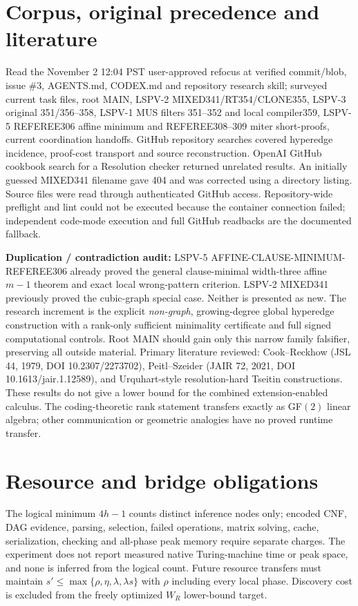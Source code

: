 \documentclass[11pt]{article}
\begin{document}
\section*{Corpus, original precedence and literature}
Read the November 2 12:04 PST user-approved refocus at verified commit/blob, issue \#3, AGENTS.md, CODEX.md and repository research skill; surveyed current task files, root MAIN, LSPV-2 MIXED341/RT354/CLONE355, LSPV-3 original 351/356--358, LSPV-1 MUS filters 351--352 and local compiler359, LSPV-5 REFEREE306 affine minimum and REFEREE308--309 miter short-proofs, current coordination handoffs. GitHub repository searches covered hyperedge incidence, proof-cost transport and source reconstruction. OpenAI GitHub cookbook search for a Resolution checker returned unrelated results. An initially guessed MIXED341 filename gave 404 and was corrected using a directory listing. Source files were read through authenticated GitHub access. Repository-wide preflight and lint could not be executed because the container connection failed; independent code-mode execution and full GitHub readbacks are the documented fallback.

\textbf{Duplication / contradiction audit:} LSPV-5 AFFINE-CLAUSE-MINIMUM-REFEREE306 already proved the general clause-minimal width-three affine $m-1$ theorem and exact local wrong-pattern criterion. LSPV-2 MIXED341 previously proved the cubic-graph special case. Neither is presented as new. The research increment is the explicit \emph{non-graph}, growing-degree global hyperedge construction with a rank-only sufficient minimality certificate and full signed computational controls. Root MAIN should gain only this narrow family falsifier, preserving all outside material. Primary literature reviewed: Cook--Reckhow (JSL 44, 1979, DOI 10.2307/2273702), Peitl--Szeider (JAIR 72, 2021, DOI 10.1613/jair.1.12589), and Urquhart-style resolution-hard Tseitin constructions. These results do not give a lower bound for the combined extension-enabled calculus. The coding-theoretic rank statement transfers exactly as GF$(2)$ linear algebra; other communication or geometric analogies have no proved runtime transfer.

\section*{Resource and bridge obligations}
The logical minimum $4h-1$ counts distinct inference nodes only; encoded CNF, DAG evidence, parsing, selection, failed operations, matrix solving, cache, serialization, checking and all-phase peak memory require separate charges. The experiment does not report measured native Turing-machine time or peak space, and none is inferred from the logical count. Future resource transfers must maintain $s'\le\max\{\rho,\eta,\lambda,\lambda s\}$ with $\rho$ including every local phase. Discovery cost is excluded from the freely optimized $W_R$ lower-bound target.
\end{document}
